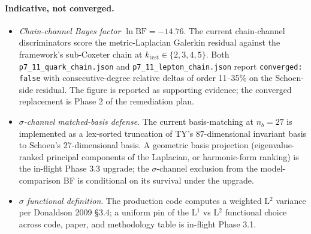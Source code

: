 ﻿\documentclass[reprint,amsmath,amssymb,aps,prd,longbibliography,floatfix]{revtex4-2}
\begin{document}
\paragraph{Indicative, not converged.}
\begin{itemize}
\item \emph{Chain-channel Bayes factor $\ln \mathrm{BF} = -14.76$}.
The current chain-channel discriminators score the
metric-Laplacian Galerkin residual against the framework's
sub-Coxeter chain at $k_\mathrm{test} \in \{2,3,4,5\}$. Both
\texttt{p7\_11\_quark\_chain.json} and
\texttt{p7\_11\_lepton\_chain.json} report
\texttt{converged: false} with consecutive-degree relative deltas
of order 11--35\% on the Schoen-side residual. The figure is
reported as supporting evidence; the converged replacement is
Phase 2 of the remediation plan.
\item \emph{$\sigma$-channel matched-basis defense}. The current
basis-matching at $n_b = 27$ is implemented as a lex-sorted
truncation of TY's 87-dimensional invariant basis to Schoen's
27-dimensional basis. A geometric basis projection
(eigenvalue-ranked principal components of the Laplacian, or
harmonic-form ranking) is the in-flight Phase 3.3 upgrade; the
$\sigma$-channel exclusion from the model-comparison BF is
conditional on its survival under the upgrade.
\item \emph{$\sigma$ functional definition}. The production code
computes a weighted L$^2$ variance per Donaldson 2009 §3.4; a uniform
pin of the L$^1$ vs L$^2$ functional choice across code, paper, and
methodology table is in-flight Phase 3.1.
\end{itemize}
\end{document}
